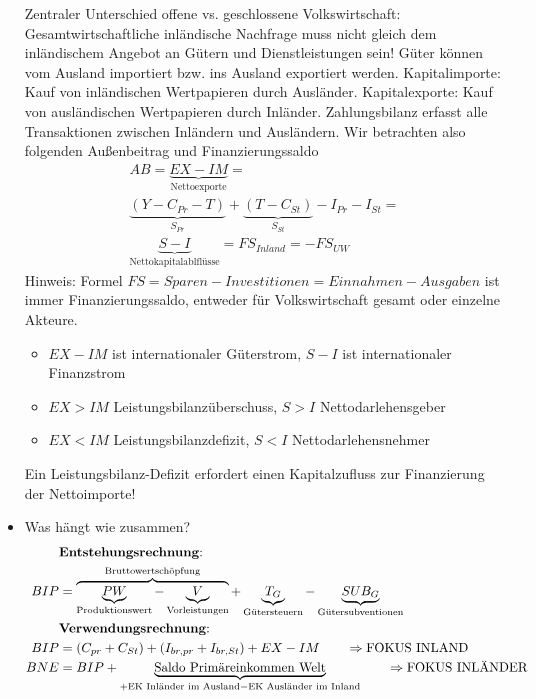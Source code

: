 \documentclass{scrartcl}
\begin{document}
\begin{itemize}
    Zentraler Unterschied offene vs. geschlossene Volkswirtschaft:\\
    Gesamtwirtschaftliche inl\"{a}ndische Nachfrage muss nicht gleich dem inl\"{a}ndischem Angebot an G\"{u}tern und Dienstleistungen sein! G\"{u}ter k\"{o}nnen vom Ausland importiert bzw. ins Ausland exportiert werden. Kapitalimporte: Kauf von inl\"{a}ndischen Wertpapieren durch Ausl\"{a}nder. Kapitalexporte: Kauf von ausl\"{a}ndischen Wertpapieren durch Inl\"{a}nder. Zahlungsbilanz erfasst alle Transaktionen zwischen Inl\"{a}ndern und Ausl\"{a}ndern. Wir betrachten also folgenden Au{\ss}enbeitrag und Finanzierungssaldo
    \begin{multline*}
      AB = \underbrace{EX-IM}_\text{Nettoexporte} = \\
      \underbrace{(Y - C_{Pr} - T)}_{S_{Pr}} + \underbrace{(T-C_{St})}_{S_{St}} - I_{Pr} - I_{St}=\\ \underbrace{S-I}_\text{Nettokapitalablfl\"{u}sse} =FS_{Inland} = -FS_{UW}
    \end{multline*}
    Hinweis: Formel $FS= Sparen-Investitionen = Einnahmen - Ausgaben$ ist immer Finanzierungssaldo, entweder f\"{u}r Volkswirtschaft gesamt oder einzelne Akteure.
    \begin{itemize}
      \item $EX-IM$ ist internationaler G\"{u}terstrom, $S-I$ ist internationaler Finanzstrom
      \item $EX>IM$ Leistungsbilanz\"{u}berschuss, $S>I$ Nettodarlehensgeber
      \item $EX<IM$ Leistungsbilanzdefizit, $S<I$ Nettodarlehensnehmer
    \end{itemize}
    Ein Leistungsbilanz-Defizit erfordert einen Kapitalzufluss zur Finanzierung der Nettoimporte!
\item Was h\"{a}ngt wie zusammen?
    \begin{align*}
    &\text{\textbf{Entstehungsrechnung}:}\\
      BIP&= \overbrace{\underbrace{PW}_\text{Produktionswert} - \underbrace{V}_\text{Vorleistungen}}^\text{Bruttowertsch\"{o}pfung} + \underbrace{T_G}_\text{G\"{u}tersteuern} - \underbrace{SUB_G}_\text{G\"{u}tersubventionen} \\
    &\text{\textbf{Verwendungsrechnung}:}\\
      BIP &= (C_{pr} + C_{St}) + (I_{br,pr}+I_{br,St}) + EX-IM \qquad \Rightarrow \text{FOKUS INLAND}\\
      BNE &= BIP +  \underbrace{\text{Saldo Prim\"{a}reinkommen Welt}}_{+\text{EK Inl\"{a}nder im Ausland}-\text{EK Ausl\"{a}nder im Inland}} \qquad \Rightarrow \text{FOKUS INL\"{A}NDER}\\

\end{align*}
\end{itemize}
\end{document}

